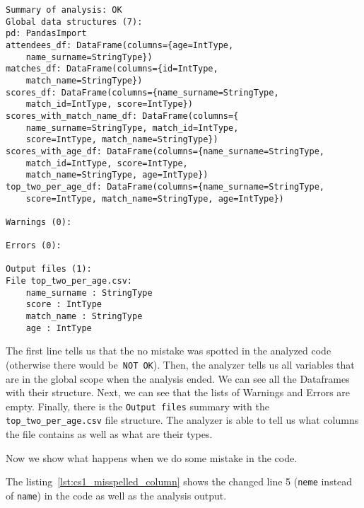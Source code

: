 \begin{lstlisting}[caption=Output of Pandalyzer on the first case study, label={lst:cs1_pandalyzer_normal}, captionpos=b]
Summary of analysis: OK
Global data structures (7):
pd: PandasImport
attendees_df: DataFrame(columns={age=IntType,
    name_surname=StringType})
matches_df: DataFrame(columns={id=IntType,
    match_name=StringType})
scores_df: DataFrame(columns={name_surname=StringType,
    match_id=IntType, score=IntType})
scores_with_match_name_df: DataFrame(columns={
    name_surname=StringType, match_id=IntType,
    score=IntType, match_name=StringType})
scores_with_age_df: DataFrame(columns={name_surname=StringType,
    match_id=IntType, score=IntType,
    match_name=StringType, age=IntType})
top_two_per_age_df: DataFrame(columns={name_surname=StringType,
    score=IntType, match_name=StringType, age=IntType})

Warnings (0):

Errors (0):

Output files (1):
File top_two_per_age.csv:
    name_surname : StringType
    score : IntType
    match_name : StringType
    age : IntType
\end{lstlisting}

The first line tells us that the no mistake was spotted in the analyzed code (otherwise there would be~\verb|NOT OK|).
Then, the analyzer tells us all variables that are in the global scope when the analysis ended.
We can see all the Dataframes with their structure.
Next, we can see that the lists of Warnings and Errors are empty.
Finally, there is the \verb|Output files| summary with the \verb|top_two_per_age.csv| file structure.
The analyzer is able to tell us what columns the file contains as well as what are their types.

Now we show what happens when we do some mistake in the code.

The listing~\ref{lst:cs1_misspelled_column} shows the changed line 5 (\verb|neme| instead of \verb|name|) in the code as
well as the analysis output.

